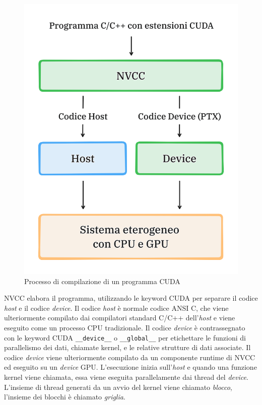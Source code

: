 \begin{figure}[ht]
    \centering
    \includegraphics[width=.6\linewidth]{images/chapter2/nvcc.png}
    \caption{Processo di compilazione di un programma CUDA}
    \label{fig:nvcc}
\end{figure}

\gls{NVCC} elabora il programma, utilizzando le keyword \gls{CUDA} per separare il codice \textit{host} e il codice \textit{device}. Il codice \textit{host} è normale codice ANSI C, che viene ulteriormente compilato dai compilatori standard C/C++ dell'\textit{host} e viene eseguito come un processo \gls{CPU} tradizionale. Il codice \textit{device} è contrassegnato con le keyword \gls{CUDA} \verb|__device__| o \verb|__global__| per etichettare le funzioni di parallelismo dei dati, chiamate kernel, e le relative strutture di dati associate. Il codice \textit{device} viene ulteriormente compilato da un componente runtime di \gls{NVCC} ed eseguito su un \textit{device} \gls{GPU}. L'esecuzione inizia sull'\textit{host} e quando una funzione kernel viene chiamata, essa viene eseguita parallelamente dai thread del \textit{device}. L'insieme di thread generati da un avvio del kernel viene chiamato \textit{blocco}, l'insieme dei blocchi è chiamato \textit{griglia}.

